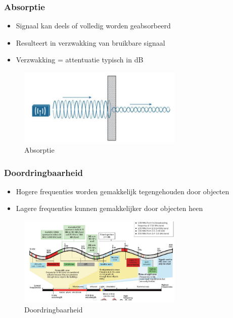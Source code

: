 \documentclass{article}
\begin{document}
\subsubsection{Absorptie}

\begin{itemize}
    \item Signaal kan deels of volledig worden geabsorbeerd 
    \item Resulteert in verzwakking van bruikbare signaal
    \item Verzwakking = attentuatie typisch in dB
\end{itemize}

\begin{figure}[H]
    \centering
    \includegraphics[width=0.7\textwidth]{Screenshot_20200309_124354.png}
    \caption{Absorptie}
\end{figure}

\subsubsection{Doordringbaarheid}
\begin{itemize}
    \item Hogere frequenties worden gemakkelijk tegengehouden door objecten
    \item Lagere frequenties kunnen gemakkelijker door objecten heen
\end{itemize}

\begin{figure}[H]
    \centering
    \includegraphics[width=0.7\textwidth]{Screenshot_20200309_124451.png}
    \caption{Doordringbaarheid}
\end{figure}
\end{document}
